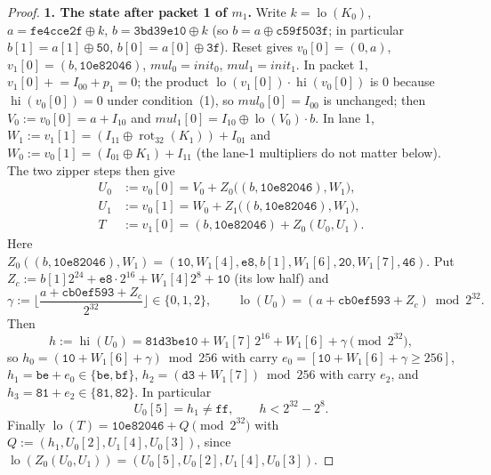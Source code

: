 \begin{proof}
\textbf{1. The state after packet 1 of $m_1$.}
Write $k=\operatorname{lo}(K_0)$, $a=\mathtt{fe4cce2f}\oplus k$, $b=\mathtt{3bd39e10}\oplus k$
(so $b=a\oplus\mathtt{c59f503f}$; in particular $b[1]=a[1]\oplus\mathtt{50}$, $b[0]=a[0]\oplus\mathtt{3f}$).
Reset gives $v_0[0]=(0,a)$, $v_1[0]=(b,\mathtt{10e82046})$, $\mathit{mul}_0=\mathit{init}_0$, $\mathit{mul}_1=\mathit{init}_1$.
In packet 1, $v_1[0]\mathrel{+}=I_{00}+p_1=0$; the product $\operatorname{lo}(v_1[0])\cdot\operatorname{hi}(v_0[0])$ is
$0$ because $\operatorname{hi}(v_0[0])=0$ under condition~(1), so $\mathit{mul}_0[0]=I_{00}$ is unchanged; then
$V_0:=v_0[0]=a+I_{10}$ and $\mathit{mul}_1[0]=I_{10}\oplus\operatorname{lo}(V_0)\cdot b$.
In lane 1, $W_1:=v_1[1]=(I_{11}\oplus\operatorname{rot}_{32}(K_1))+I_{01}$ and
$W_0:=v_0[1]=(I_{01}\oplus K_1)+I_{11}$ (the lane-1 multipliers do not matter below).
The two zipper steps then give
\begin{equation}\label{eq:U0}
\begin{aligned}
U_0&:=v_0[0]=V_0+Z_0\big((b,\mathtt{10e82046}),W_1\big),\\
U_1&:=v_0[1]=W_0+Z_1\big((b,\mathtt{10e82046}),W_1\big),\\
T&:=v_1[0]=(b,\mathtt{10e82046})+Z_0(U_0,U_1).
\end{aligned}
\end{equation}
Here $Z_0((b,\mathtt{10e82046}),W_1)=(\mathtt{10},W_1[4],\mathtt{e8},b[1],W_1[6],\mathtt{20},W_1[7],\mathtt{46})$.
Put $Z_c:=b[1]2^{24}+\mathtt{e8}\cdot2^{16}+W_1[4]2^{8}+\mathtt{10}$ (its low half) and
\begin{equation}\label{eq:gamma}
\gamma:=\Big\lfloor\frac{a+\mathtt{cb0ef593}+Z_c}{2^{32}}\Big\rfloor\in\{0,1,2\},
\qquad \operatorname{lo}(U_0)=(a+\mathtt{cb0ef593}+Z_c)\bmod 2^{32}.
\end{equation}
Then
\begin{equation}\label{eq:h}
h:=\operatorname{hi}(U_0)=\mathtt{81d3be10}+W_1[7]\,2^{16}+W_1[6]+\gamma \pmod{2^{32}},
\end{equation}
so $h_0=(\mathtt{10}+W_1[6]+\gamma)\bmod 256$ with carry $e_0=[\mathtt{10}+W_1[6]+\gamma\ge256]$,
$h_1=\mathtt{be}+e_0\in\{\mathtt{be},\mathtt{bf}\}$, $h_2=(\mathtt{d3}+W_1[7])\bmod256$ with carry $e_2$, and
$h_3=\mathtt{81}+e_2\in\{\mathtt{81},\mathtt{82}\}$. In particular
\begin{equation}\label{eq:hbounds}
U_0[5]=h_1\ne\mathtt{ff},\qquad h<2^{32}-2^{8}.
\end{equation}
Finally $\operatorname{lo}(T)=\mathtt{10e82046}+Q\pmod{2^{32}}$ with $Q:=(h_1,U_0[2],U_1[4],U_0[3])$, since
$\operatorname{lo}(Z_0(U_0,U_1))=(U_0[5],U_0[2],U_1[4],U_0[3])$.


\end{proof}
